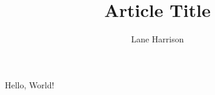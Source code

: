 \documentclass[11pt, titlepage]{article}
\title{Article Title}
\author{Lane Harrison}
\begin{document}
\maketitle

Hello, World!
\end{document}
